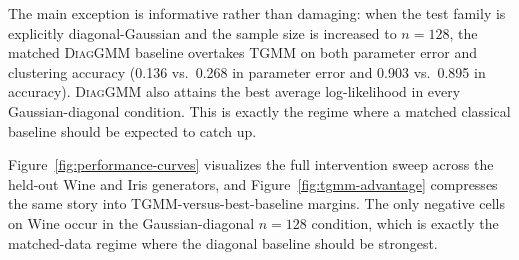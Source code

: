\documentclass{article}
\newcommand{\tgmm}{\textsc{TGMM}}
\newcommand{\diaggmm}{\textsc{DiagGMM}}
\begin{document}
The main exception is informative rather than damaging: when the test family is explicitly diagonal-Gaussian and the sample size is increased to $n=128$, the matched \diaggmm{} baseline overtakes \tgmm{} on both parameter error and clustering accuracy (0.136 vs.~0.268 in parameter error and 0.903 vs.~0.895 in accuracy). \diaggmm{} also attains the best average log-likelihood in every Gaussian-diagonal condition. This is exactly the regime where a matched classical baseline should be expected to catch up.

Figure~\ref{fig:performance-curves} visualizes the full intervention sweep across the held-out Wine and Iris generators, and Figure~\ref{fig:tgmm-advantage} compresses the same story into TGMM-versus-best-baseline margins. The only negative cells on Wine occur in the Gaussian-diagonal $n=128$ condition, which is exactly the matched-data regime where the diagonal baseline should be strongest.
\end{document}
